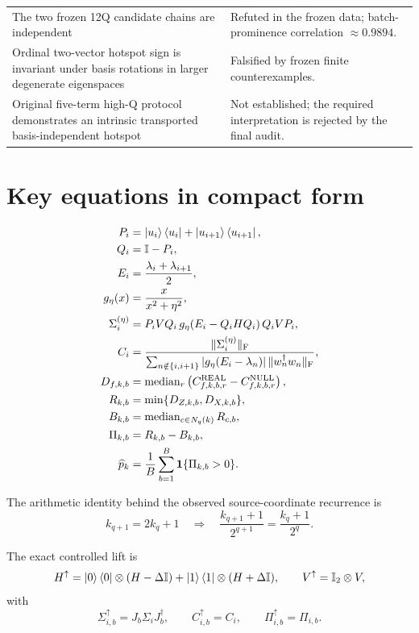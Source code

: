 \documentclass[11pt,a4paper]{article}
\newcommand{\Real}{\mathrm{REAL}}
\newcommand{\Null}{\mathrm{NULL}}
\newcommand{\Id}{\mathbb I}
\newcommand{\Prom}{\Pi}
\newcommand{\med}{\operatorname{median}}
\newcommand{\fro}{\mathrm F}
\begin{document}
\begin{longtable}{@{}p{}p{}@{}}
The two frozen 12Q candidate chains are independent &
Refuted in the frozen data; batch-prominence correlation \(\approx0.9894\).\\

Ordinal two-vector hotspot sign is invariant under basis rotations in larger
degenerate eigenspaces &
Falsified by frozen finite counterexamples.\\

Original five-term high-Q protocol demonstrates an intrinsic transported
basis-independent hotspot &
Not established; the required interpretation is rejected by the final audit.\\
\bottomrule
\end{longtable}

\section{Key equations in compact form}

\begin{align}
P_i
&=
\ket{u_i}\bra{u_i}
+
\ket{u_{i+1}}\bra{u_{i+1}},
\\
Q_i&=\Id-P_i,
\\
E_i&=\frac{\lambda_i+\lambda_{i+1}}{2},
\\
g_\eta(x)&=\frac{x}{x^2+\eta^2},
\\
\Sigma_i^{(\eta)}
&=
P_iVQ_i\,g_\eta(E_i-Q_iHQ_i)\,Q_iVP_i,
\\
C_i
&=
\frac{\|\Sigma_i^{(\eta)}\|_{\fro}}
{\sum_{n\notin\{i,i+1\}}
 |g_\eta(E_i-\lambda_n)|\,\|w_n^\dagger w_n\|_{\fro}},
\\
D_{f,k,b}
&=
\med_r
\left(
C^{\Real}_{f,k,b,r}
-
C^{\Null}_{f,k,b,r}
\right),
\\
R_{k,b}
&=
\min\{D_{Z,k,b},D_{X,k,b}\},
\\
B_{k,b}
&=
\med_{c\in N_q(k)}R_{c,b},
\\
\Prom_{k,b}
&=
R_{k,b}-B_{k,b},
\\
\widehat p_k
&=
\frac1B
\sum_{b=1}^{B}\mathbf1\{\Prom_{k,b}>0\}.
\end{align}

The arithmetic identity behind the observed source-coordinate recurrence is
\[
k_{q+1}=2k_q+1
\quad\Longrightarrow\quad
\frac{k_{q+1}+1}{2^{q+1}}
=
\frac{k_q+1}{2^q}.
\]

The exact controlled lift is
\[
H^\uparrow
=
\ket0\bra0\otimes(H-\Delta\Id)
+
\ket1\bra1\otimes(H+\Delta\Id),
\qquad
V^\uparrow=\Id_2\otimes V,
\]
with
\[
\Sigma_{i,b}^{\uparrow}
=
J_b\Sigma_iJ_b^\dagger,
\qquad
C_{i,b}^{\uparrow}=C_i,
\qquad
\Prom_{i,b}^{\uparrow}=\Prom_{i,b}.
\]
\end{document}
